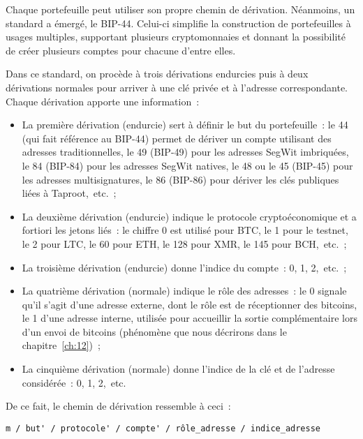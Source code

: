 Chaque portefeuille peut utiliser son propre chemin de dérivation. Néanmoins, un standard a émergé, le BIP-44. Celui-ci simplifie la construction de portefeuilles à usages multiples, supportant plusieurs cryptomonnaies et donnant la possibilité de créer plusieurs comptes pour chacune d'entre elles.

Dans ce standard, on procède à trois dérivations endurcies puis à deux dérivations normales pour arriver à une clé privée et à l'adresse correspondante. Chaque dérivation apporte une information~:

\begin{itemize}
  \item La première dérivation (endurcie) sert à définir le but du portefeuille~: le 44 (qui fait référence au BIP-44) permet de dériver un compte utilisant des adresses traditionnelles, le 49 (BIP-49) pour les adresses SegWit imbriquées, le 84 (BIP-84) pour les adresses SegWit natives, le 48 ou le 45 (BIP-45) pour les adresses multisignatures, le 86 (BIP-86) pour dériver les clés publiques liées à Taproot,~etc.~;
  \item La deuxième dérivation (endurcie) indique le protocole cryptoéconomique et a fortiori les jetons liés~: le chiffre 0 est utilisé pour BTC, le 1 pour le testnet, le 2 pour LTC, le 60 pour ETH, le 128 pour XMR, le 145 pour BCH,~etc.~;
  \item La troisième dérivation (endurcie) donne l'indice du compte~: 0, 1, 2,~etc.~;
  \item La quatrième dérivation (normale) indique le rôle des adresses~: le 0 signale qu'il s'agit d'une adresse externe, dont le rôle est de réceptionner des bitcoins, le 1 d'une adresse interne, utilisée pour accueillir la sortie complémentaire lors d'un envoi de bitcoins (phénomène que nous décrirons dans le chapitre~\ref{ch:12})~;
  \item La cinquième dérivation (normale) donne l'indice de la clé et de l'adresse considérée~: 0, 1, 2,~etc.
\end{itemize}

De ce fait, le chemin de dérivation ressemble à ceci~:

\begin{Verbatim}[fontsize=\footnotesize]
m / but' / protocole' / compte' / rôle_adresse / indice_adresse
\end{Verbatim}


